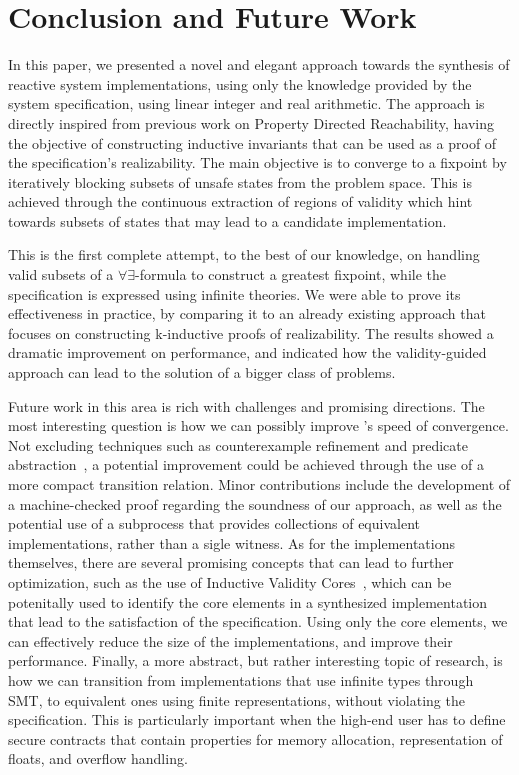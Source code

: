 \section{Conclusion and Future Work}
\label{sec:conclusion}

In this paper, we presented a novel and elegant approach towards the synthesis
of reactive system implementations, using only the knowledge provided by the
system specification, using linear integer and real arithmetic. The approach is
directly inspired from previous work on Property Directed Reachability, having the objective of constructing inductive
invariants that can be used as a proof of the specification's realizability. The
main objective is to converge to a fixpoint by iteratively blocking subsets of
unsafe states from the problem space. This is achieved through the continuous
extraction of regions of validity which hint towards subsets of states that may
lead to a candidate implementation.

This is the first complete attempt, to the best of our knowledge, on handling
valid subsets of a $\forall\exists$-formula to construct a greatest fixpoint,
while the specification is expressed using infinite theories. We were able to
prove its effectiveness in practice, by comparing it to an already existing
approach that focuses on constructing k-inductive proofs of realizability. The
results showed a dramatic improvement on performance, and indicated how the
validity-guided approach can lead to the solution of a bigger class of problems.

Future work in this area is rich with challenges and promising directions. The
most interesting question is how we can possibly improve \jsynvg's
speed of convergence. Not excluding techniques such as counterexample
refinement and predicate abstraction~\cite{walker2014predicate}, a potential
improvement could be achieved through the use of a more compact transition
relation. Minor contributions include the development of a  machine-checked
proof regarding the soundness of our approach, as well as the potential use of a
subprocess that provides collections of equivalent implementations, rather than
a sigle witness. As for the implementations themselves, there are
several promising concepts that can lead to further optimization, such as the use of Inductive Validity Cores~\cite{Ghass16}, which can be potenitally used to identify the core elements in a synthesized implementation that lead to the satisfaction of the specification. Using only
the core elements, we can effectively reduce the size of the implementations,
and improve their performance. Finally, a more abstract, but rather interesting
topic of research, is how we can transition from implementations that use
infinite types through SMT, to equivalent ones using finite representations,
without violating the specification. This is particularly important when the
high-end user has to define secure contracts that contain properties for memory
allocation, representation of floats, and overflow handling.
